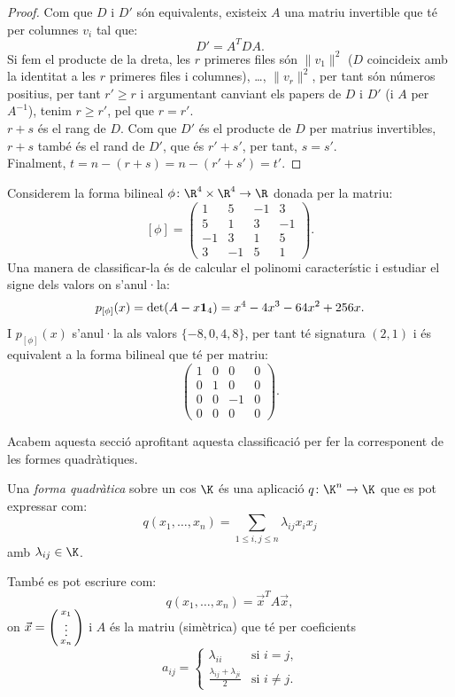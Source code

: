 \begin{proof}
Com que $D$ i $D'$ són equivalents, existeix $A$ una matriu invertible que té per columnes $v_i$ tal que:
\[
D'=A^T D A.
\]
Si fem el producte de la dreta, les $r$ primeres files són $\|v_1\|^2$ ($D$ coincideix amb la identitat a les $r$ primeres files i columnes), \ldots, $\|v_r\|^2$, per tant són números positius, per tant $r'\geq r$ i argumentant canviant els papers de $D$ i $D'$ (i $A$ per $A^{-1}$), tenim $r\geq r'$, pel que $r=r'$.\\
$r+s$ és el rang de $D$. Com que $D'$ és el producte de $D$ per matrius invertibles, $r+s$ també és el rand de $D'$, que és $r'+s'$, per tant, $s=s'$.\\
Finalment, $t=n-(r+s)=n-(r'+s')=t'$.
\end{proof}
\begin{exemple}\label{exemple:class_form_bil}
Considerem la forma bilineal $\phi\colon \R^4\times\R^4\to\R$ donada per la matriu:
\[
[\phi]=\left(\begin{array}{rrrr}
1 & 5 & -1 & 3 \\
5 & 1 & 3 & -1 \\
-1 & 3 & 1 & 5 \\
3 & -1 & 5 & 1
\end{array}\right).
\]
Una manera de classificar-la és de calcular el polinomi característic i estudiar el signe dels valors on s'anul·la:
\[
p_{[\phi]}(x)=\det(A-x\mathbf{1}_4)=x^{4} - 4 x^{3} - 64 x^{2} + 256 x .
\]
I $p_{[\phi]}(x)$ s'anul·la als valors $\{-8,0,4,8\}$, per tant té signatura $(2,1)$ i és equivalent a la forma bilineal que té per matriu:
\[
\begin{pmatrix} 1 & 0 & 0 & 0 \\ 0 & 1 & 0 & 0 \\ 0 & 0 & -1 & 0 \\ 0 & 0 & 0 & 0 \end{pmatrix} .
\]
\end{exemple}

Acabem aquesta secció aprofitant aquesta classificació per fer la corresponent de les formes quadràtiques.

\begin{definicio}
Una \emph{forma quadràtica} sobre un cos $\K$ és una aplicació $q\colon \K^n\to \K$ que es pot expressar com:
\[
q(x_1, \dots , x_n)=\sum_{1\leq i , j \leq n} \lambda_{ij}x_i x_j
\]
amb $\lambda_{ij}\in \K$.

També es pot escriure com:
\[
q(x_1, \dots , x_n)= \vec x^T A \vec x ,
\]
on $\vec x=\left(\begin{smallmatrix}x_1 \\ \vdots \\ x_n\end{smallmatrix}\right)$ i $A$ és la matriu (simètrica) que té per coeficients
\[
a_{ij}=\begin{cases} \lambda_{ii} & \text{si $i=j$,} \\ \frac{\lambda_{ij}+\lambda_{ji}}{2} & \text{si $i\neq j$.}\end{cases}
\]
\end{definicio}


